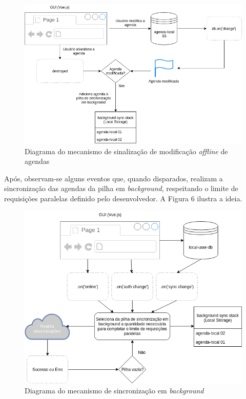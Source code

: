 \documentclass[
	article,			%
	12pt,				%
	oneside,			%
	a4paper,			%
	english,			%
	brazil,				%
	sumario=tradicional
	]{abntex2}
\begin{document}
\begin{figure}[H]
	\centering
	\caption{Diagrama do mecanismo de sinalização de modificação \textit{offline} de agendas}
	\includegraphics[width=1\textwidth]{figures/riffnailer-schedule-flags}
\end{figure}

Após, observam-se alguns eventos que, quando disparados, realizam a sincronização das agendas da pilha em \textit{background}, respeitando o limite de requisições paralelas definido pelo desenvolvedor. A Figura 6 ilustra a ideia.

\begin{figure}[H]
	\centering
	\caption{Diagrama do mecanismo de sincronização em \textit{background}}
	\includegraphics[width=1\textwidth]{figures/riffnailer-schedule-flags-sync}
\end{figure}
\end{document}
